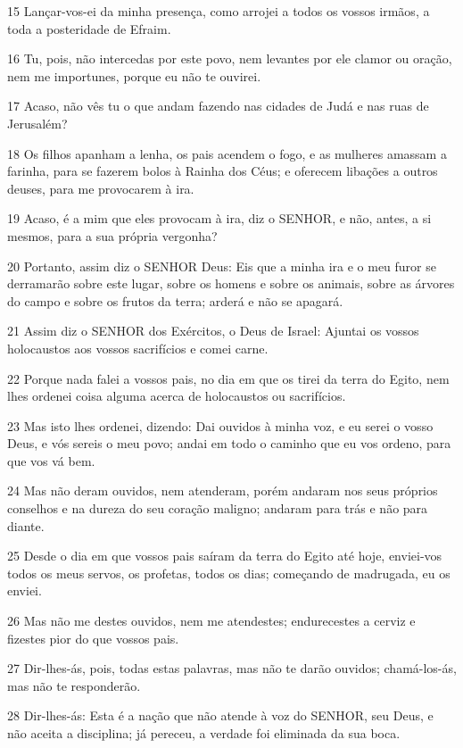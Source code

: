 \par 15 Lançar-vos-ei da minha presença, como arrojei a todos os vossos irmãos, a toda a posteridade de Efraim.
\par 16 Tu, pois, não intercedas por este povo, nem levantes por ele clamor ou oração, nem me importunes, porque eu não te ouvirei.
\par 17 Acaso, não vês tu o que andam fazendo nas cidades de Judá e nas ruas de Jerusalém?
\par 18 Os filhos apanham a lenha, os pais acendem o fogo, e as mulheres amassam a farinha, para se fazerem bolos à Rainha dos Céus; e oferecem libações a outros deuses, para me provocarem à ira.
\par 19 Acaso, é a mim que eles provocam à ira, diz o SENHOR, e não, antes, a si mesmos, para a sua própria vergonha?
\par 20 Portanto, assim diz o SENHOR Deus: Eis que a minha ira e o meu furor se derramarão sobre este lugar, sobre os homens e sobre os animais, sobre as árvores do campo e sobre os frutos da terra; arderá e não se apagará.
\par 21 Assim diz o SENHOR dos Exércitos, o Deus de Israel: Ajuntai os vossos holocaustos aos vossos sacrifícios e comei carne.
\par 22 Porque nada falei a vossos pais, no dia em que os tirei da terra do Egito, nem lhes ordenei coisa alguma acerca de holocaustos ou sacrifícios.
\par 23 Mas isto lhes ordenei, dizendo: Dai ouvidos à minha voz, e eu serei o vosso Deus, e vós sereis o meu povo; andai em todo o caminho que eu vos ordeno, para que vos vá bem.
\par 24 Mas não deram ouvidos, nem atenderam, porém andaram nos seus próprios conselhos e na dureza do seu coração maligno; andaram para trás e não para diante.
\par 25 Desde o dia em que vossos pais saíram da terra do Egito até hoje, enviei-vos todos os meus servos, os profetas, todos os dias; começando de madrugada, eu os enviei.
\par 26 Mas não me destes ouvidos, nem me atendestes; endurecestes a cerviz e fizestes pior do que vossos pais.
\par 27 Dir-lhes-ás, pois, todas estas palavras, mas não te darão ouvidos; chamá-los-ás, mas não te responderão.
\par 28 Dir-lhes-ás: Esta é a nação que não atende à voz do SENHOR, seu Deus, e não aceita a disciplina; já pereceu, a verdade foi eliminada da sua boca.
